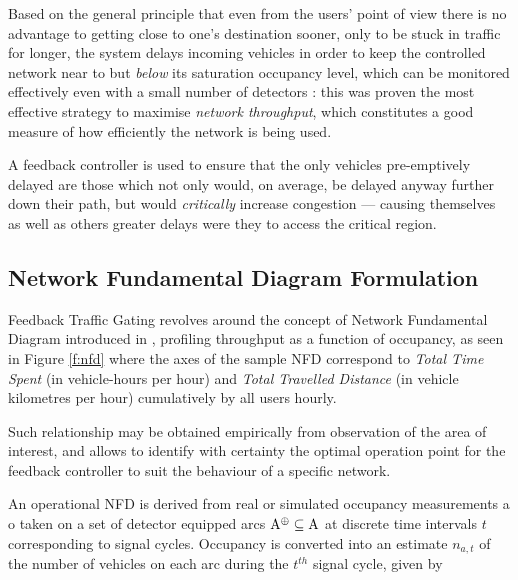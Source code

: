 Based on the general principle that even from the users’ point of view there is no advantage to getting close to one’s destination sooner, only to be stuck in traffic for longer, the system delays incoming vehicles in order to keep the controlled network near to but \emph{below} its saturation occupancy level, which can be monitored effectively even with a small number of detectors \citep{keyvan2013urban}: this was proven the most effective strategy to maximise \emph{network throughput}, which constitutes a good measure of how efficiently the network is being used.

A feedback controller is used to ensure that the only vehicles pre-emptively delayed are those which not only would, on average, be delayed anyway further down their path, but would \emph{critically} increase congestion — causing themselves  as well as others greater delays were they to access the critical region.

\subsection{Network Fundamental Diagram Formulation}
Feedback Traffic Gating revolves around the concept of Network Fundamental Diagram
introduced in \citep{keyvan2012congestion}, profiling throughput as a function of occupancy, as seen in Figure \ref{f:nfd} where the axes of the sample NFD correspond to \emph{Total Time Spent} (in vehicle-hours per hour) and \emph{Total Travelled Distance} (in vehicle kilometres per hour) cumulatively by all users hourly. 

Such relationship may be obtained empirically from observation of the
area of interest, and allows to identify with certainty the optimal operation point for the
feedback controller to suit the behaviour of a specific network.


An operational NFD is derived from real or simulated occupancy measurements a o
taken on a set of detector equipped arcs $\mathrm{A}^\oplus \subseteq \mathrm{A}$ at discrete time intervals $t$ corresponding to signal cycles.
Occupancy is converted into an estimate $n_{a,t}$ of the number of vehicles on each
arc during the $t^{th}$ signal cycle, given by

